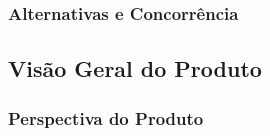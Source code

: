\subsubsection{Alternativas e Concorrência}

\subsection{Visão Geral do Produto}

\subsubsection{Perspectiva do Produto}

